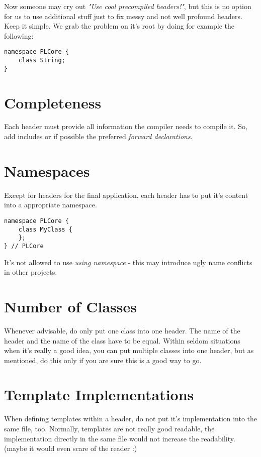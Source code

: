 Now someone may cry out \emph{"Use cool precompiled headers!"}, but this is no option for us to use additional stuff just to fix messy and not well profound headers. Keep it simple. We grab the problem on it's root by doing for example the following:

\begin{lstlisting}[caption=Forward declaration]
namespace PLCore {
	class String;
}
\end{lstlisting}




\section{Completeness}
Each header must provide all information the compiler needs to compile it. So, add includes or if possible the preferred \emph{forward declarations}.




\section{Namespaces}
Except for headers for the final application, each header has to put it's content into a appropriate namespace.

\begin{lstlisting}[caption=Namespace definition]
namespace PLCore {
	class MyClass {
	};
} // PLCore
\end{lstlisting}

It's not allowed to use \emph{using namespace} - this may introduce ugly name conflicts in other projects.




\section{Number of Classes}
Whenever advisable, do only put one class into one header. The name of the header and the name of the class have to be equal. Within seldom situations when it's really a good idea, you can put multiple classes into one header, but as mentioned, do this only if you are sure this is a good way to go.




\section{Template Implementations}
When defining templates within a header, do not put it's implementation into the same file, too. Normally, templates are not really good readable, the implementation directly in the same file would not increase the readability. (maybe it would even scare of the reader :)

